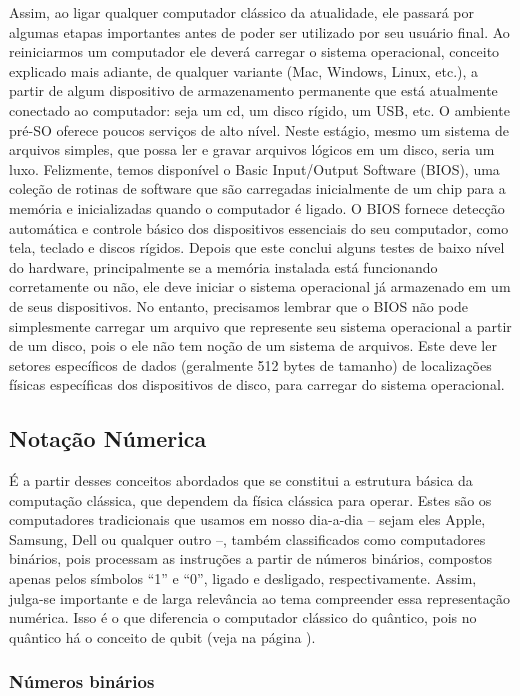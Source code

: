 Assim, ao ligar qualquer computador clássico da atualidade, ele passará por algumas etapas importantes antes de poder ser utilizado por seu usuário final. Ao reiniciarmos um computador ele deverá carregar o sistema operacional, conceito explicado mais adiante, de qualquer variante (Mac, Windows, Linux, etc.), a partir de algum dispositivo de armazenamento permanente que está atualmente conectado ao computador: seja um cd, um disco rígido, um USB, etc. O ambiente pré-SO oferece poucos serviços de alto nível. Neste estágio, mesmo um sistema de arquivos simples, que possa ler e gravar arquivos lógicos em um disco, seria um luxo. Felizmente, temos disponível o Basic Input/Output Software (BIOS), uma coleção de rotinas de software que são carregadas inicialmente de um chip para a memória e inicializadas quando o computador é ligado. O BIOS fornece detecção automática e controle básico dos dispositivos essenciais do seu computador, como tela, teclado e discos rígidos. Depois que este conclui alguns testes de baixo nível do hardware, principalmente se a memória instalada está funcionando corretamente ou não, ele deve iniciar o sistema operacional já armazenado em um de seus dispositivos. No entanto, precisamos lembrar que o BIOS não pode simplesmente carregar um arquivo que represente seu sistema operacional a partir de um disco, pois o ele não tem noção de um sistema de arquivos. Este deve ler setores específicos de dados (geralmente 512 bytes de tamanho) de localizações físicas específicas dos dispositivos de disco, para carregar do sistema operacional.

\subsection{Notação Númerica}

É a partir desses conceitos abordados que se constitui a estrutura básica da computação clássica, que dependem da física clássica para operar. Estes são os computadores tradicionais que usamos em nosso dia-a-dia – sejam eles Apple, Samsung, Dell ou qualquer outro –, também classificados como computadores binários, pois processam as instruções a partir de números binários, compostos apenas pelos símbolos ``1'' e ``0'', ligado e desligado, respectivamente. Assim, julga-se importante e de larga relevância ao tema compreender essa representação numérica. Isso é o que diferencia o computador clássico do quântico, pois no quântico há o conceito de qubit (veja na página \pageref{qubits}).

\subsubsection{Números binários}

